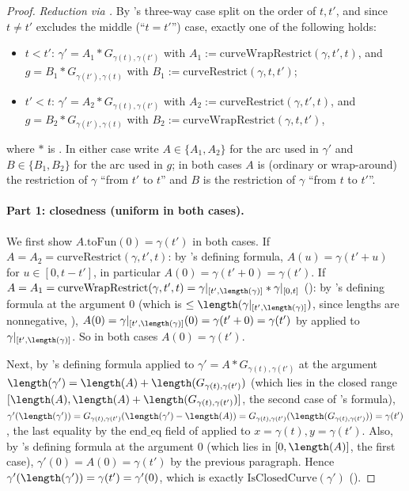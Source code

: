 \begin{proof}
  \emph{Reduction via .} By 's three-way case split on the order
  of $t,t'$, and since $t \ne t'$ excludes the middle (``$t=t'$'') case, exactly one of the following
  holds:
  \begin{itemize}
    \item $t < t'$: $\gamma' = A_1 * G_{\gamma(t),\gamma(t')}$ with $A_1 :=
      \mathrm{curveWrapRestrict}(\gamma,t',t)$, and $g = B_1 * G_{\gamma(t'),\gamma(t)}$ with $B_1 :=
      \mathrm{curveRestrict}(\gamma,t,t')$;
    \item $t' < t$: $\gamma' = A_2 * G_{\gamma(t),\gamma(t')}$ with $A_2 :=
      \mathrm{curveRestrict}(\gamma,t',t)$, and $g = B_2 * G_{\gamma(t'),\gamma(t)}$ with $B_2 :=
      \mathrm{curveWrapRestrict}(\gamma,t,t')$,
  \end{itemize}
  where $*$ is . In either case write $A \in \{A_1,A_2\}$ for the arc used in
  $\gamma'$ and $B \in \{B_1,B_2\}$ for the arc used in $g$; in both cases $A$ is (ordinary or
  wrap-around) the restriction of $\gamma$ ``from $t'$ to $t$'' and $B$ is the restriction of
  $\gamma$ ``from $t$ to $t'$''.

  \paragraph{Part 1: closedness (uniform in both cases).} We first show $A.\mathrm{toFun}(0) =
  \gamma(t')$ in both cases. If $A = A_2 = \mathrm{curveRestrict}(\gamma,t',t)$: by
  's defining formula, $A(u) = \gamma(t' + u)$ for $u \in [0,t-t']$, in
  particular $A(0) = \gamma(t'+0) = \gamma(t')$. If $A = A_1 =
  \mathrm{curveWrapRestrict}(\gamma,t',t) = \gamma|_{[t',\length(\gamma)]} *
  \gamma|_{[0,t]}$ (): by 's defining formula at
  the argument $0$ (which is $\le \length(\gamma|_{[t',\length(\gamma)]})$, since lengths are
  nonnegative, ), $A(0) = \gamma|_{[t',\length(\gamma)]}(0) = \gamma(t'+0) = \gamma(t')$
  by  applied to $\gamma|_{[t',\length(\gamma)]}$. So in both cases
  $A(0)=\gamma(t')$.

  Next, by 's defining formula applied to $\gamma' = A *
  G_{\gamma(t),\gamma(t')}$ at the argument $\length(\gamma') = \length(A) +
  \length(G_{\gamma(t),\gamma(t')})$ (which lies in the closed range
  $[\length(A),\length(A)+\length(G_{\gamma(t),\gamma(t')})]$, the second case of
  's formula), $\gamma'(\length(\gamma')) =
  G_{\gamma(t),\gamma(t')}(\length(\gamma')-\length(A)) = G_{\gamma(t),\gamma(t')}
  (\length(G_{\gamma(t),\gamma(t')}))= \gamma(t')$, the last equality by the $\mathrm{end\_eq}$ field
  of  applied to $x=\gamma(t),y=\gamma(t')$. Also, by
  's defining formula at the argument $0$ (which lies in $[0,\length(A)]$, the
  first case), $\gamma'(0) = A(0) = \gamma(t')$ by the previous paragraph. Hence
  $\gamma'(\length(\gamma')) = \gamma(t') = \gamma'(0)$, which is exactly $\mathrm{IsClosedCurve}(\gamma')$
  ().


\end{proof}
